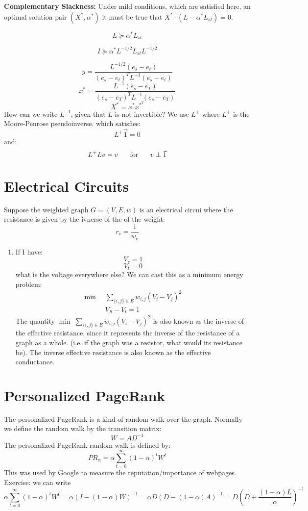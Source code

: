 \documentclass[11pt]{article}
\begin{document}
\textbf{Complementary Slackness:} Under mild conditions, which are satisfied here, an optimal solution pair $(X^*,\alpha^*)$ it must be true that $X^*\cdot (L-\alpha^*L_{st})=0$.

\[
    L \succeq \alpha^* L_{st}
\]

\[
    I \succeq \alpha^* L ^{-1/2}L_{st}L ^{-1/2}
\]

\[
    y = \frac{L ^{-1/2}(e_s - e_t)}{(e_s - e_t)^TL ^{-1}(e_s-e_t)}
\]
\[
    x^* = \frac{L^{-1}(e_s - e_T)}{(e_s - e_T)^TL^{-1}(e_s - e_T)}
\]
\[
    X^*= x^*x^{*^T}
\]
How can we write $L^{-1}$, given that $L$ is not invertible? We use $L^{+}$ where $L^{+}$ is the Moore-Penrose pseudoinverse.
which satisfies:
\[
    L^{+}\vec{1} = 0
\]
and:
\[
    L^{+}L v = v \hspace{5mm}\text{ for } \hspace{5mm}v\perp \vec{1}
\]

\section*{Electrical Circuits}
Suppose the weighted graph $G=(V,E, w)$ is an electrical circui where the resistance is given by the ivnerse of the of the weight:
\[
    r_e = \frac{1}{w_e}
\]
\begin{enumerate}
    \item If I have:
    \[
        V_s = 1
    \]
    \[
        V_t = 0
    \]
    what is the voltage everywhere else?
    We can cast this as a minimum energy problem:
    \begin{align*}
    \min \;&\; \sum_{\{i,j\}\in E} w_{i,j} (V_i - V_j)^2\\
    &\; V_S - V_t =1
    \end{align*}
    The quantity $\min \; \sum_{\{i,j\}\in E} w_{i,j} (V_i - V_j)^2$ is also known as the inverse of the effective resistance, since it represents the inverse of the resistance of a graph as a whole. (i.e. if the graph was a resistor, what would its resistance be). The inverse effective resistance is also known as the effective conductance.
\end{enumerate}

\section*{Personalized PageRank}
The personalized PageRank is a kind of random walk over the graph. Normally we define the random walk by the transition matrix:
\[
    W= AD^{-1}
\]
The personalized PageRank random walk is defined by:
\[
    PR_{\alpha} = \alpha \sum_{t = 0 }^{\infty}(1- \alpha)^t W^t
\]
This was used by Google to measure the reputation/importance of webpages. 
Exercise: we can write
\[
    \alpha \sum_{t = 0 }^{\infty}(1- \alpha)^t W^t = \alpha(I - (1-\alpha)W)^{-1} = \alpha D(D - (1-\alpha)A)^{-1} =  D\left(D + \frac{(1-\alpha)L}{\alpha}\right)^{-1}
\]
\end{document}
